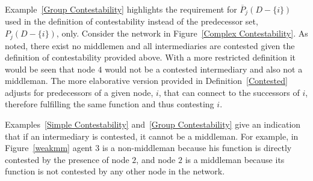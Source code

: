 \documentclass[11pt,fleqn]{article}
\begin{document}
Example~\ref{Group Contestability} highlights the requirement for $\overline{P}_{j}(D - \{i\})$ used in the definition of contestability instead of the predecessor set, $P_{j}(D - \{i\})$, only. Consider the network in Figure~\ref{Complex Contestability}. As noted, there exist no middlemen and all intermediaries are contested given the definition of contestability provided above. With a more restricted definition it would be seen that node $4$ would not be a contested intermediary and also not a middleman. The more elaborative version provided in Definition~\ref{Contested} adjusts for predecessors of a given node, $i$, that can connect to the successors of $i$, therefore fulfilling the same function and thus contesting $i$. 

Examples~\ref{Simple Contestability} and~\ref{Group Contestability} give an indication that if an intermediary is contested, it cannot be a middleman. For example, in Figure~\ref{weakmm} agent $3$ is a non-middleman because his function is directly contested by the presence of node $2$, and node $2$ is a middleman because its function is not contested by any other node in the network.
\end{document}
